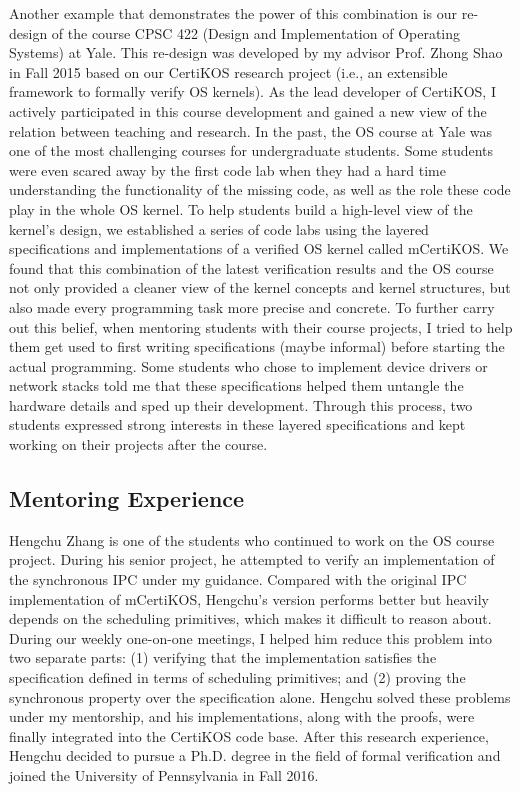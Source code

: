 \documentclass[a4paper, 10pt]{article}
\begin{document}
\begin{small}
Another example that demonstrates the power of this combination
is our re-design of the course CPSC 422 (Design and Implementation of Operating Systems) at Yale. This re-design was developed
by my advisor Prof. Zhong Shao in Fall 2015 based on our CertiKOS research project (i.e., an extensible framework to formally verify OS kernels).
As the lead developer of CertiKOS, I actively participated in this course development and gained a new view of the relation between teaching and research.
In the past, the OS course at Yale was one of the most challenging courses for undergraduate students. Some students were even scared away
by the first code lab when they had a hard time understanding the functionality of the missing code,
as well as the role these code play in the whole OS kernel. 
To help students build a high-level view of the kernel's design,
we established a series of code labs  using the layered specifications and implementations of a verified OS kernel called mCertiKOS. 
We found that this combination of the latest verification results
and the OS course not only provided a cleaner view of the kernel  concepts and kernel structures, but also made every programming task more precise and concrete.
To further carry out this belief, 
when mentoring students with their course projects,
I tried to help them get used to first writing specifications (maybe informal) before starting the actual programming. Some students who
chose to implement device drivers or network stacks told
me that these specifications helped them untangle
the hardware details and sped up their development. Through 
this process, two students expressed strong interests in these layered specifications and  kept working on their projects after the course. 

\subsection*{Mentoring Experience}
Hengchu Zhang is one of the students who
continued to work on the OS course project.
During his senior project, he attempted to verify an implementation of the synchronous IPC
under my guidance.
Compared with the original IPC implementation of mCertiKOS,
Hengchu's version performs better but heavily depends on the scheduling primitives, which makes it difficult to reason about.
During our weekly one-on-one meetings, I helped him
reduce this problem into two separate parts: (1) verifying that
the implementation satisfies the specification defined in terms
of scheduling primitives; and (2)  proving the synchronous property over the specification alone. Hengchu solved these problems under my mentorship, and his implementations, along with the proofs, were finally integrated into the CertiKOS code base. After this research experience, Hengchu decided to pursue a Ph.D. degree in the field of formal verification and joined the University of Pennsylvania in Fall 2016.


\end{small}
\end{document}
